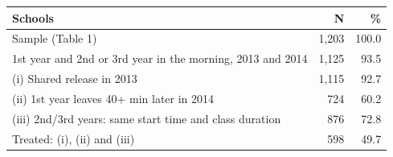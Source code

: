 
\begin{tabular}{lrr}
\toprule
Schools & N & \%\\
\midrule
Sample (Table 1) & 1,203 & 100.0\\
1st year and 2nd or 3rd year in the morning, 2013 and 2014 & 1,125 & 93.5\\
(i) Shared release in 2013 & 1,115 & 92.7\\
(ii) 1st year leaves 40+ min later in 2014 & 724 & 60.2\\
(iii) 2nd/3rd years: same start time and class duration & 876 & 72.8\\
Treated: (i), (ii) and (iii) & 598 & 49.7\\
\bottomrule
\end{tabular}
